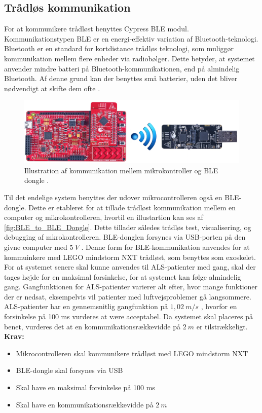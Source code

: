 \subsection{Trådløs kommunikation}\label{sec:traadloes_komm_design}
For at kommunikere trådløst benyttes Cypress BLE modul. Kommunikationstypen BLE \citep{cypressguide2014} er en energi-effektiv variation af Bluetooth-teknologi. Bluetooth er en standard for kortdistance trådløs teknologi, som muliggør kommunikation mellem flere enheder via radiobølger. Dette betyder, at systemet anvender mindre batteri på Bluetooth-kommunikationen, end på almindelig Bluetooth. Af denne grund kan der benyttes små batterier, uden det bliver nødvendigt at skifte dem ofte \citep{gupta2013}. 


\begin{figure}[H]
	\centering
	\includegraphics[width=1\textwidth]{figures/BLEToBLEdongle}
	\caption{Illustration af kommunikation mellem mikrokontroller og BLE dongle \citep{cypresspsoc2015, cypressguide2014}.}
	\label{fig:BLE_to_BLE_Dongle}
\end{figure}

\noindent
Til det endelige system benyttes der udover mikrocontrolleren også en BLE-dongle. Dette er etableret for at tillade trådløst kommunikation mellem en computer og mikrokontrolleren, hvortil en illustartion kan ses af \autoref{fig:BLE_to_BLE_Dongle}. Dette tillader således trådløs test, visualisering, og debugging af mkrokontrolleren. BLE-donglen forsynes via USB-porten på den givne computer med $5~V$ \citep{cypressguide2014}. Denne form for BLE-kommunikation anvendes for at kommuinkere med LEGO mindstorm NXT trådløst, som benyttes som exoskelet. For at systemet senere skal kunne anvendes til ALS-patienter med gang, skal der tages højde for en maksimal forsinkelse, for at systemet kan følge almindelig gang. Gangfunktionen for ALS-patienter varierer alt efter, hvor mange funktioner der er nedsat, eksempelvis vil patienter med luftvejsproblemer gå langsommere. ALS-patienter har en gennemsnitlig gangfunktion på $1,02~m/s$ \citep{hausdorff2000}, hvorfor en forsinkelse på 100 ms vurderes at være acceptabel. Da systemet skal placeres på benet, vurderes det at en kommunikationsrækkevidde på $2~m$ er tilstrækkeligt.
\\

\textbf{Krav:}
\begin{itemize}
\item Mikrocontrolleren skal kommunikere trådløst med LEGO mindstorm NXT
\item BLE-dongle skal forsynes via USB
\item Skal have en maksimal forsinkelse på 100 ms 
\item Skal have en kommunikationsrækkevidde på $2~m$
\end{itemize}